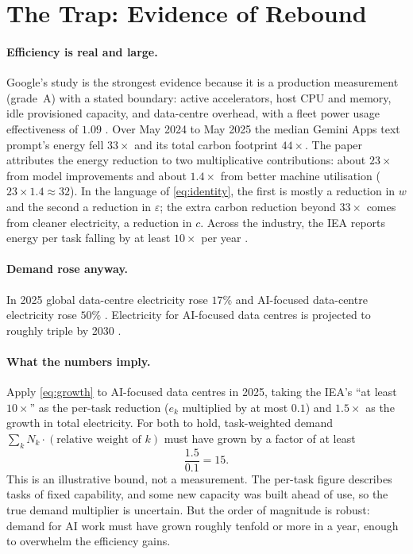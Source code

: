 \documentclass[11pt]{article}
\theoremstyle{definition}
\theoremstyle{remark}
\begin{document}
\section{The Trap: Evidence of Rebound}\label{sec:trap}

\paragraph{Efficiency is real and large.} Google's study is the strongest evidence because it is a production measurement (grade~A) with a stated boundary: active accelerators, host CPU and memory, idle provisioned capacity, and data-centre overhead, with a fleet power usage effectiveness of $1.09$ \citep{elsworth2025}. Over May 2024 to May 2025 the median Gemini Apps text prompt's energy fell $33\times$ and its total carbon footprint $44\times$. The paper attributes the energy reduction to two multiplicative contributions: about $23\times$ from model improvements and about $1.4\times$ from better machine utilisation ($23 \times 1.4 \approx 32$). In the language of \eqref{eq:identity}, the first is mostly a reduction in $w$ and the second a reduction in $\varepsilon$; the extra carbon reduction beyond $33\times$ comes from cleaner electricity, a reduction in $c$. Across the industry, the IEA reports energy per task falling by at least $10\times$ per year \citep{iea2026}.

\paragraph{Demand rose anyway.} In 2025 global data-centre electricity rose $17\%$ and AI-focused data-centre electricity rose $50\%$ \citep{iea2026}. Electricity for AI-focused data centres is projected to roughly triple by 2030 \citep{iea2026}.

\paragraph{What the numbers imply.} Apply \eqref{eq:growth} to AI-focused data centres in 2025, taking the IEA's ``at least $10\times$'' as the per-task reduction ($e_k$ multiplied by at most $0.1$) and $1.5\times$ as the growth in total electricity. For both to hold, task-weighted demand $\sum_k N_k \cdot(\text{relative weight of }k)$ must have grown by a factor of at least
\[
  \frac{1.5}{0.1} = 15 .
\]
This is an illustrative bound, not a measurement. The per-task figure describes tasks of fixed capability, and some new capacity was built ahead of use, so the true demand multiplier is uncertain. But the order of magnitude is robust: demand for AI work must have grown roughly tenfold or more in a year, enough to overwhelm the efficiency gains.
\end{document}
